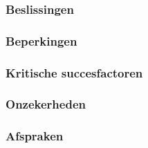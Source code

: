 
\subsubsection{Beslissingen}

\subsubsection{Beperkingen}

\subsubsection{Kritische succesfactoren}

\subsubsection{Onzekerheden}

\subsubsection{Afspraken}
